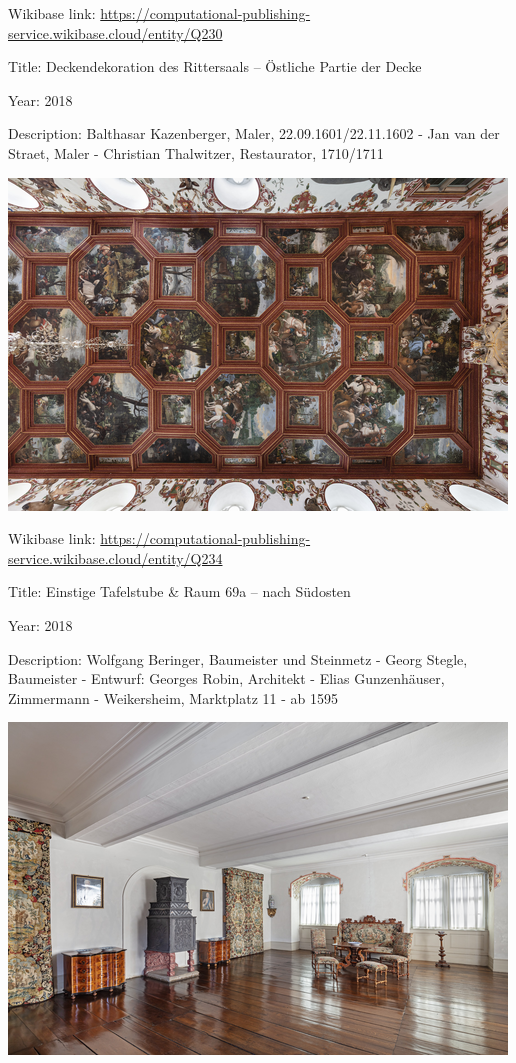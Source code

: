 \documentclass[
  letterpaper,
]{book}
\begin{document}
Wikibase link:
\url{https://computational-publishing-service.wikibase.cloud/entity/Q230}

Title: Deckendekoration des Rittersaals -- Östliche Partie der Decke

Year: 2018

Description: Balthasar Kazenberger, Maler, 22.09.1601/22.11.1602 - Jan
van der Straet, Maler - Christian Thalwitzer, Restaurator, 1710/1711

\includegraphics{paintings_files/figure-pdf/cell-3-output-20.png}

Wikibase link:
\url{https://computational-publishing-service.wikibase.cloud/entity/Q234}

Title: Einstige Tafelstube \& Raum 69a -- nach Südosten

Year: 2018

Description: Wolfgang Beringer, Baumeister und Steinmetz - Georg Stegle,
Baumeister - Entwurf: Georges Robin, Architekt - Elias Gunzenhäuser,
Zimmermann - Weikersheim, Marktplatz 11 - ab 1595

\includegraphics{paintings_files/figure-pdf/cell-3-output-22.png}
\end{document}
